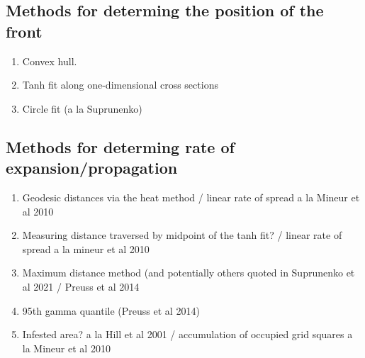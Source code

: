 \documentclass[9pt, reqno]{amsart}
\numberwithin{equation}{section}
\renewcommand{\(}{\left(}
\renewcommand{\)}{\right)}
\theoremstyle{definition}
\theoremstyle{definition}
\theoremstyle{definition}
\begin{document}
	

	\subsection*{Methods for determing the position of the front}
	\begin{enumerate}
		\item Convex hull. 	
		\item Tanh fit along one-dimensional cross sections
		\item Circle fit (a la Suprunenko)

	\end{enumerate}

	\subsection*{Methods for determing rate of expansion/propagation}
	\begin{enumerate}
		\item Geodesic distances via the heat method  / linear rate of spread a la Mineur et al 2010
		\item Measuring distance traversed by midpoint of the tanh fit? / linear rate of spread a la mineur et al 2010
		\item Maximum distance method (and potentially others quoted in Suprunenko et al 2021 / Preuss et al 2014
		\item 95th gamma quantile (Preuss et al 2014)
		\item Infested area? a la Hill et al 2001 / accumulation of occupied grid squares a la Mineur et al 2010
	\end{enumerate}





\def\bibcommenthead{}%


\end{document}

